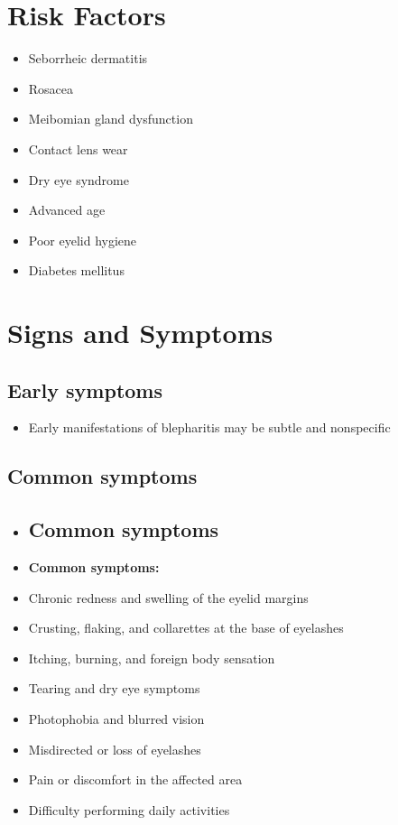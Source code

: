 \section{Risk Factors}

\begin{itemize}[noitemsep]
  \item Seborrheic dermatitis
  \item Rosacea
  \item Meibomian gland dysfunction
  \item Contact lens wear
  \item Dry eye syndrome
  \item Advanced age
  \item Poor eyelid hygiene
  \item Diabetes mellitus
\end{itemize}

\section{Signs and Symptoms}

\subsection{Early symptoms}
\begin{itemize}[noitemsep]
  \item Early manifestations of blepharitis may be subtle and nonspecific
\end{itemize}

\subsection{Common symptoms}
\begin{itemize}[noitemsep]
  \item \subsection{Common symptoms}
  \item \textbf{Common symptoms:}
  \item Chronic redness and swelling of the eyelid margins
  \item Crusting, flaking, and collarettes at the base of eyelashes
  \item Itching, burning, and foreign body sensation
  \item Tearing and dry eye symptoms
  \item Photophobia and blurred vision
  \item Misdirected or loss of eyelashes
  \item Pain or discomfort in the affected area
  \item Difficulty performing daily activities
\end{itemize}

